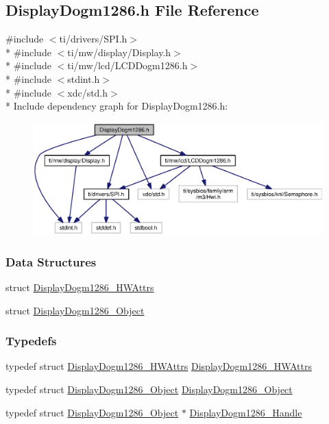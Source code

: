 \subsection{Display\+Dogm1286.\+h File Reference}
\label{_display_dogm1286_8h}
{\ttfamily \#include $<$ti/drivers/\+S\+P\+I.\+h$>$}\\*
{\ttfamily \#include $<$ti/mw/display/\+Display.\+h$>$}\\*
{\ttfamily \#include $<$ti/mw/lcd/\+L\+C\+D\+Dogm1286.\+h$>$}\\*
{\ttfamily \#include $<$stdint.\+h$>$}\\*
{\ttfamily \#include $<$xdc/std.\+h$>$}\\*
Include dependency graph for Display\+Dogm1286.\+h\+:
\nopagebreak
\begin{figure}[H]
\begin{center}
\leavevmode
\includegraphics[width=350pt]{_display_dogm1286_8h__incl}
\end{center}
\end{figure}
\subsubsection*{Data Structures}
\begin{DoxyCompactItemize}
\item 
struct \hyperlink{struct_display_dogm1286___h_w_attrs}{Display\+Dogm1286\+\_\+\+H\+W\+Attrs}
\item 
struct \hyperlink{struct_display_dogm1286___object}{Display\+Dogm1286\+\_\+\+Object}
\end{DoxyCompactItemize}
\subsubsection*{Typedefs}
\begin{DoxyCompactItemize}
\item 
typedef struct \hyperlink{struct_display_dogm1286___h_w_attrs}{Display\+Dogm1286\+\_\+\+H\+W\+Attrs} \hyperlink{_display_dogm1286_8h_a59380665e121771f575e353c0fa5f69c}{Display\+Dogm1286\+\_\+\+H\+W\+Attrs}
\item 
typedef struct \hyperlink{struct_display_dogm1286___object}{Display\+Dogm1286\+\_\+\+Object} \hyperlink{_display_dogm1286_8h_ae9fcc5568d4b81bf8085ec89ef4b655c}{Display\+Dogm1286\+\_\+\+Object}
\item 
typedef struct \hyperlink{struct_display_dogm1286___object}{Display\+Dogm1286\+\_\+\+Object} $\ast$ \hyperlink{_display_dogm1286_8h_a717f1494741e8428201f7204f6d5c4d5}{Display\+Dogm1286\+\_\+\+Handle}
\end{DoxyCompactItemize}
